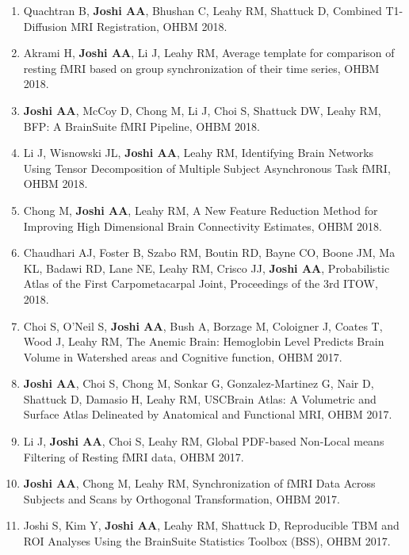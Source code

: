 \documentclass[overlapped,line,letterpaper]{res}
\begin{document}
\begin{resume}
\begin{enumerate}
    \item Quachtran B, \textbf{Joshi AA}, Bhushan C, Leahy RM, Shattuck D, {Combined T1-Diffusion MRI Registration}, OHBM 2018.

    \item Akrami H, \textbf{Joshi AA}, Li J, Leahy RM, {Average template for comparison of resting fMRI based on group synchronization of their time series}, OHBM 2018.

    \item \textbf{Joshi AA}, McCoy D, Chong M, Li J, Choi S, Shattuck DW, Leahy RM, {BFP: A BrainSuite fMRI Pipeline}, OHBM 2018.

    \item Li J, Wisnowski JL, \textbf{Joshi AA}, Leahy RM, {Identifying Brain Networks Using Tensor Decomposition of Multiple Subject Asynchronous Task fMRI}, OHBM 2018.

    \item Chong M, \textbf{Joshi AA}, Leahy RM, {A New Feature Reduction Method for Improving High Dimensional Brain Connectivity Estimates}, OHBM 2018.

    \item Chaudhari AJ, Foster B, Szabo RM, Boutin RD, Bayne CO, Boone JM, Ma KL, Badawi RD, Lane NE, Leahy RM, Crisco JJ, \textbf{Joshi AA}, {Probabilistic Atlas of the First Carpometacarpal Joint}, Proceedings of the 3rd ITOW, 2018.

    \item Choi S, O'Neil S, \textbf{Joshi AA}, Bush A, Borzage M, Coloigner J, Coates T, Wood J, Leahy RM, {The Anemic Brain: Hemoglobin Level Predicts Brain Volume in Watershed areas and Cognitive function}, OHBM 2017.

    \item \textbf{Joshi AA}, Choi S, Chong M, Sonkar G, Gonzalez-Martinez G, Nair D, Shattuck D,  Damasio H, Leahy RM, {USCBrain Atlas: A Volumetric and Surface Atlas Delineated by Anatomical and Functional MRI}, OHBM 2017.

    \item Li J, \textbf{Joshi AA}, Choi S, Leahy RM, {Global PDF-based Non-Local means Filtering of Resting fMRI data}, OHBM 2017.

    \item \textbf{Joshi AA}, Chong M, Leahy RM, {Synchronization of fMRI Data Across Subjects and Scans by Orthogonal Transformation}, OHBM 2017.

    \item Joshi S, Kim Y, \textbf{Joshi AA}, Leahy RM,  Shattuck D, {Reproducible TBM and ROI Analyses Using the BrainSuite Statistics Toolbox (BSS)}, OHBM 2017.
    

\end{enumerate}
\end{resume}
\end{document}
